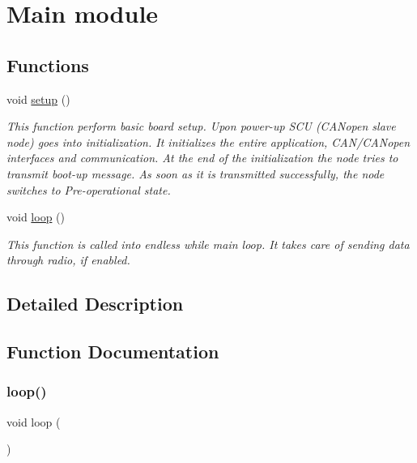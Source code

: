 \hypertarget{group___main__group__module}{}\section{Main module}
\label{group___main__group__module}
\subsection*{Functions}
\begin{DoxyCompactItemize}
\item 
void \mbox{\hyperlink{group___main__group__module_ga4fc01d736fe50cf5b977f755b675f11d}{setup}} ()
\begin{DoxyCompactList}\small\item\em This function perform basic board setup. Upon power-\/up S\+CU (C\+A\+Nopen slave node) goes into initialization. It initializes the entire application, C\+A\+N/\+C\+A\+Nopen interfaces and communication. At the end of the initialization the node tries to transmit boot-\/up message. As soon as it is transmitted successfully, the node switches to Pre-\/operational state. \end{DoxyCompactList}\item 
void \mbox{\hyperlink{group___main__group__module_gafe461d27b9c48d5921c00d521181f12f}{loop}} ()
\begin{DoxyCompactList}\small\item\em This function is called into endless while main loop. It takes care of sending data through radio, if enabled. \end{DoxyCompactList}\end{DoxyCompactItemize}


\subsection{Detailed Description}


\subsection{Function Documentation}
\mbox{\label{group___main__group__module_gafe461d27b9c48d5921c00d521181f12f}} 
\subsubsection{\texorpdfstring{loop()}{loop()}}
{\footnotesize\ttfamily void loop (\begin{DoxyParamCaption}{ }\end{DoxyParamCaption})}



